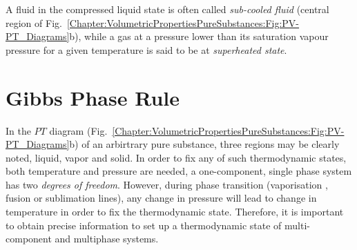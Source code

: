 A fluid in the compressed liquid state is often called {\it sub-cooled fluid} (central region of Fig.~\ref{Chapter:VolumetricPropertiesPureSubstances:Fig:PV-PT_Diagrams}b), while a gas at a pressure lower than its saturation vapour pressure for a given temperature is said to be at {\it superheated state}.


\section{Gibbs Phase Rule}\label{Chapter:VolumetricPropertiesPureSubstances:Section:GibbsPhaseRule}
  In the $PT$ diagram (Fig.~\ref{Chapter:VolumetricPropertiesPureSubstances:Fig:PV-PT_Diagrams}b) of an arbirtrary pure substance, three regions may be clearly noted, liquid, vapor and solid. In order to fix any of such thermodynamic states, both temperature and pressure are needed, \ie a one-component, single phase system has two {\it degrees of freedom}. However, during phase transition (\eg vaporisation , fusion or sublimation lines), any change in pressure will lead to change in temperature in order to fix the thermodynamic state. Therefore, it is important to obtain precise information to set up a thermodynamic state of multi-component and multiphase systems.

